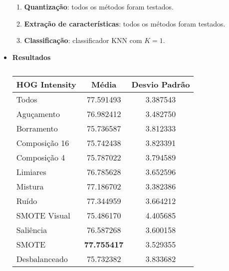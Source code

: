 \begin{itemize}
\begin{enumerate}

\item \textbf{Quantização}: todos os métodos foram testados.
\item \textbf{Extração de características}: todos os métodos foram testados.
\item \textbf{Classificação}: classificador KNN com $K=1$.
\end{enumerate}

\item[] \textbf{Resultados}

\begin{table}[!htbp]
\centering
\caption{}
\label{tab:resultados:x:melhor}
\begin{tabular}{|l|c|c|}
\hline
\textbf{HOG Intensity} & \textbf{Média}     & \textbf{Desvio Padrão} \\ \hline
   Todos        &  77.591493 &  3.387543  \\ \hline
  Aguçamento    &  76.982412 &  3.482750  \\ \hline
  Borramento    &  75.736587 &  3.812333  \\ \hline
  Composição 16 &  75.742438 &  3.823391  \\ \hline
  Composição 4  &  75.787022 &  3.794589  \\ \hline
  Limiares      &  76.785628 &  3.652596  \\ \hline
  Mistura       &  77.186702 &  3.382386  \\ \hline
  Ruído         &  77.344959 &  3.664212  \\ \hline
  SMOTE Visual  &  75.486170 &  4.405685  \\ \hline
  Saliência     &  76.587268 &  3.600158  \\ \hline
 SMOTE          &  \textbf{77.755417} &  3.529355  \\ \hline
Desbalanceado   &  75.732382 &  3.833682  \\ \hline
\end{tabular}
\end{table}


\end{itemize}
